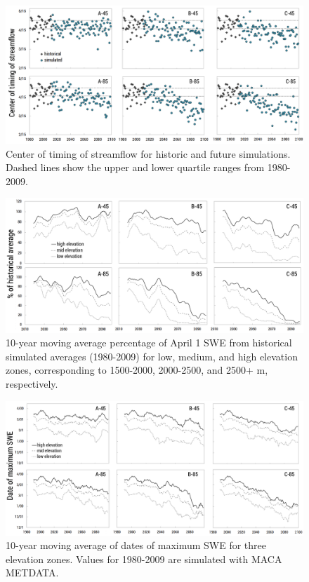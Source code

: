 \documentclass[water,article,submit,moreauthors,pdftex,10pt,a4paper]{mdpi}
\theoremstyle{mdpi}
\newcounter{ex}
\newcounter{re}
\theoremstyle{mdpidefinition}
\begin{document}
\begin{figure}
\centering
\includegraphics[width=\textwidth]{figure-files/figure11.png}
\caption{Center of timing of streamflow for historic and future simulations. Dashed lines show the upper and lower quartile ranges from 1980-2009. }
\label{fig:CenterOfTiming}
\end{figure}
\clearpage

\begin{figure}
\centering
\includegraphics[width=\textwidth]{figure-files/figure12.png}
\caption{10-year moving average percentage of April 1 SWE from historical simulated averages (1980-2009) for low, medium, and high elevation zones, corresponding to 1500-2000, 2000-2500, and 2500+ m, respectively.}
\label{fig:PercentApril1SWE}
\end{figure}
\clearpage

\begin{figure}
\centering
\includegraphics[width=\textwidth]{figure-files/figure13.png}
\caption{10-year moving average of dates of maximum SWE for three elevation zones. Values for 1980-2009 are simulated with MACA METDATA.}
\label{fig:MaxSWEDate}
\end{figure}
\clearpage
\end{document}
